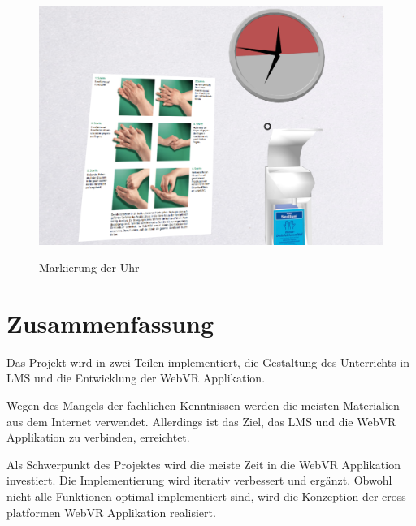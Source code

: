 \begin{figure}[ht]
\vspace*{1em}
\centering
\caption[Markierung der Uhr]{Markierung der Uhr}
\includegraphics[width=\textwidth]{images/clockMarker.png}
\label{fig:clockMarker} 
\end{figure}

\section{Zusammenfassung}
Das Projekt wird in zwei Teilen implementiert, die Gestaltung des Unterrichts in LMS und die Entwicklung der WebVR Applikation.

Wegen des Mangels der fachlichen Kenntnissen werden die meisten Materialien aus dem Internet verwendet. Allerdings ist das Ziel, das LMS und die WebVR Applikation zu verbinden, erreichtet.

Als Schwerpunkt des Projektes wird die meiste Zeit in die WebVR Applikation investiert. Die Implementierung wird iterativ verbessert und ergänzt. Obwohl nicht alle Funktionen optimal implementiert sind, wird die Konzeption der cross-platformen WebVR Applikation realisiert.
